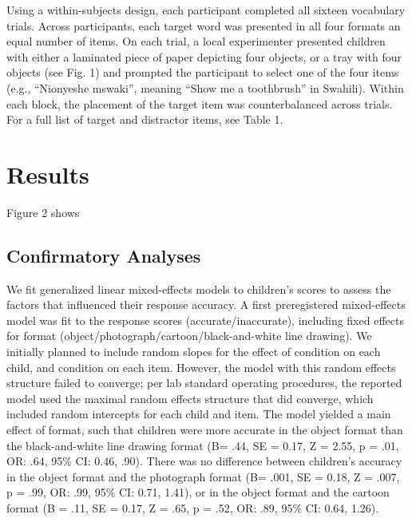 \documentclass[10pt, letterpaper]{article}
\begin{document}
Using a within-subjects design, each participant completed all sixteen
vocabulary trials. Across participants, each target word was presented
in all four formats an equal number of items. On each trial, a local
experimenter presented children with either a laminated piece of paper
depicting four objects, or a tray with four objects (see Fig. 1) and
prompted the participant to select one of the four items (e.g.,
``Nionyeshe mswaki'', meaning ``Show me a toothbrush'' in Swahili).
Within each block, the placement of the target item was counterbalanced
across trials. For a full list of target and distractor items, see Table
1.

\section{Results}\label{results}

Figure 2 shows

\subsection{Confirmatory Analyses}\label{confirmatory-analyses}

We fit generalized linear mixed-effects models to children's scores to
assess the factors that influenced their response accuracy. A first
preregistered mixed-effects model was fit to the response scores
(accurate/inaccurate), including fixed effects for format
(object/photograph/cartoon/black-and-white line drawing). We initially
planned to include random slopes for the effect of condition on each
child, and condition on each item. However, the model with this random
effects structure failed to converge; per lab standard operating
procedures, the reported model used the maximal random effects structure
that did converge, which included random intercepts for each child and
item. The model yielded a main effect of format, such that children were
more accurate in the object format than the black-and-white line drawing
format (B= .44, SE = 0.17, Z = 2.55, p = .01, OR: .64, 95\% CI: 0.46,
.90). There was no difference between children's accuracy in the object
format and the photograph format (B= .001, SE = 0.18, Z = .007, p = .99,
OR: .99, 95\% CI: 0.71, 1.41), or in the object format and the cartoon
format (B = .11, SE = 0.17, Z = .65, p = .52, OR: .89, 95\% CI: 0.64,
1.26).
\end{document}
